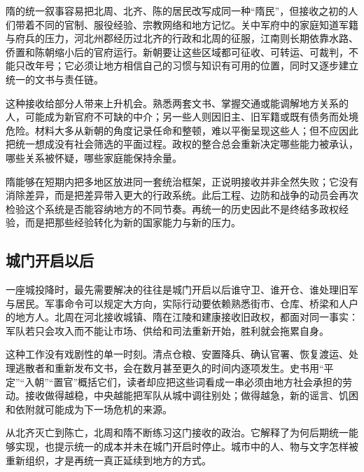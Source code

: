 隋的统一叙事容易把北周、北齐、陈的居民改写成同一种“隋民”，但接收之初的人们带着不同的官制、服役经验、宗教网络和地方记忆。关中军府中的家庭知道军籍与府兵的压力，河北州郡经历过北齐的行政和北周的征服，江南则长期依靠水路、侨置和陈朝缩小后的官府运行。新朝要让这些区域都可征收、可转运、可裁判，不能只改年号；它必须让地方相信自己的习惯与知识有可用的位置，同时又逐步建立统一的文书与责任链。

这种接收给部分人带来上升机会。熟悉两套文书、掌握交通或能调解地方关系的人，可能成为新官府不可缺的中介；另一些人则因旧主、旧军籍或既有债务而处境危险。材料大多从新朝的角度记录任命和整顿，难以平衡呈现这些人；但不应因此把统一想成没有社会筛选的平面过程。政权的整合总会重新决定哪些能力被承认，哪些关系被怀疑，哪些家庭能保持余量。

隋能够在短期内把多地区放进同一套统治框架，正说明接收并非全然失败；它没有消除差异，而是把差异带入更大的行政系统。此后工程、边防和战争的动员会再次检验这个系统是否能容纳地方的不同节奏。再统一的历史因此不是终结多政权经验，而是把那些经验转化为新的国家能力与新的压力。

\subsection{城门开启以后}

一座城投降时，最先需要解决的往往是城门开启以后谁守卫、谁开仓、谁处理旧军与居民。军事命令可以规定大方向，实际行动要依赖熟悉街市、仓库、桥梁和人户的地方人。北周在河北接收城镇、隋在江陵和建康接收旧政权，都面对同一事实：军队若只会攻入而不能让市场、供给和司法重新开始，胜利就会拖累自身。

这种工作没有戏剧性的单一时刻。清点仓粮、安置降兵、确认官署、恢复渡运、处理逃散者和重新发布文书，会在数月甚至更久的时间内逐项发生。史书用“平定”“入朝”“置官”概括它们，读者却应把这些词看成一串必须由地方社会承担的劳动。接收做得越稳，中央越能把军队从城中调往别处；做得越急，新的谣言、饥困和依附就可能成为下一场危机的来源。

从北齐灭亡到陈亡，北周和隋不断练习这门接收的政治。它解释了为何后期统一能够实现，也提示统一的成本并未在城门开启时停止。城市中的人、物与文字怎样被重新组织，才是再统一真正延续到地方的方式。
